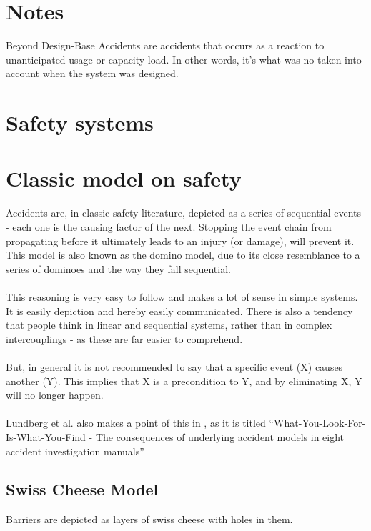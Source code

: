 

\section{Notes}
Beyond Design-Base Accidents are accidents that occurs as a reaction to unanticipated usage or capacity load. In other words, it's what was no taken into account when the system was designed.

\section{Safety systems}

\section{Classic model on safety}
Accidents are, in classic safety literature, depicted as a series of sequential events - each one is the causing factor of the next. Stopping the event chain from propagating before it ultimately leads to an injury (or damage), will prevent it. This model is also known as the domino model, due to its close resemblance to a series of dominoes and the way they fall sequential.\\
\\
This reasoning is very easy to follow and makes a lot of sense in simple systems. It is easily depiction and hereby easily communicated. There is also a tendency that people think in linear and sequential systems, rather than in complex intercouplings - as these are far easier to comprehend.\\
\\
But, in general it is not recommended to say that a specific event (X) causes another (Y). This implies that X is a precondition to Y, and by eliminating X, Y will no longer happen\cite{sklet2002methods}.\\
\\
Lundberg et al. also makes a point of this in \cite{lundberg2009you}, as it is titled ``What-You-Look-For-Is-What-You-Find - The consequences of underlying accident models in eight accident investigation manuals''


\subsection{Swiss Cheese Model}

Barriers are depicted as layers of swiss cheese with holes in them. 



